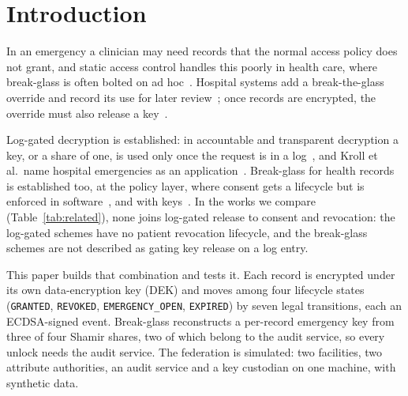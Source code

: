 \section{Introduction}\label{sec:intro}

In an emergency a clinician may need records that the normal access policy does not grant, and static access control handles this poorly in health care, where break-glass is often bolted on ad hoc~\cite{brucker2009extending}.
Hospital systems add a break-the-glass override and record its use for later review~\cite{ferreira2006break}; once records are encrypted, the override must also release a key~\cite{brucker2010abe,li2013phr}.

Log-gated decryption is established: in accountable and transparent decryption a key, or a share of one, is used only once the request is in a log~\cite{ryan2017accountable,kroll2018accountable,cheval2023transparency}, and Kroll et al.\ name hospital emergencies as an application~\cite{kroll2018accountable}.
Break-glass for health records is established too, at the policy layer, where consent gets a lifecycle but is enforced in software~\cite{muslim2026consent}, and with keys~\cite{brucker2010abe,deoliveira2020breakglass,yang2018libac,romel2025patient}.
In the works we compare (Table~\ref{tab:related}), none joins log-gated release to consent and revocation: the log-gated schemes have no patient revocation lifecycle, and the break-glass schemes are not described as gating key release on a log entry.

This paper builds that combination and tests it.
Each record is encrypted under its own data-encryption key (DEK) and moves among four lifecycle states (\texttt{GRANTED}, \texttt{REVOKED}, \texttt{EMERGENCY\_OPEN}, \texttt{EXPIRED}) by seven legal transitions, each an ECDSA-signed event.
Break-glass reconstructs a per-record emergency key from three of four Shamir shares, two of which belong to the audit service, so every unlock needs the audit service.
The federation is simulated: two facilities, two attribute authorities, an audit service and a key custodian on one machine, with synthetic data.

